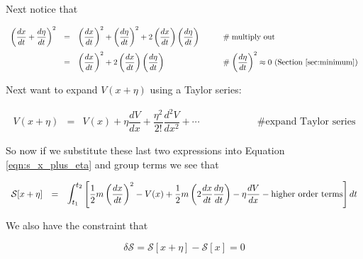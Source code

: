 \documentclass{article}
\theoremstyle{definition}
\begin{document}
\bigskip
\noindent
Next notice that 


\bigskip
\begin{equation*}
\begin{array}{lllll}
 \left ( \dfrac{dx}{dt} + \dfrac{d\eta}{dt} \right )^2 
&=&  \left (\dfrac{dx}{dt} \right)^2 + \left (\dfrac{d\eta }{dt} \right)^2  +2 \left ( \dfrac{dx}{dt} \right ) \left ( \dfrac{d\eta}{dt} \right )          
                                                        &\qquad \mathrel{\#} \text{multiply out} \\
[12pt]
&=&  \left (\dfrac{dx}{dt} \right)^2 + 2 \left ( \dfrac{dx}{dt}
\right ) \left ( \dfrac{d\eta}{dt} \right )
                                                        &\qquad \mathrel {\#} \text{$\left ( \dfrac{d\eta }{dt} \right )^2 \approx 0$ (Section \ref{sec:minimum})}
\end{array}
\end{equation*}

\bigskip
\noindent
Next want to expand $ V(x + \eta)$ using a Taylor series:

\medskip
\begin{equation*}
\begin{array}{lllll}
 V(x + \eta)
&=& V(x) + \eta \dfrac{dV}{dx} + \dfrac{\eta^2}{2!}  \dfrac{d^2V}{dx^2} + \cdots			
														&\quad \qquad \qquad \mathrel{\#} \text{expand Taylor series}
\end{array}
\end{equation*}

\bigskip
\noindent
So now if we substitute these last two expressions into Equation
\ref{eqn:s_x_plus_eta}  and group terms we see that 

\bigskip
\bigskip
\begin{equation*}
\begin{array}{lllll}
\mathcal{S}[x + \eta]
&=& {\displaystyle \mathlarger{ \int_{t_1}^{t_2}} \left [ \frac{1}{2} m \left ( \dfrac{dx}{dt} \right )^2 - V(x) 
+ \dfrac{1}{2} m \left (2 \dfrac{dx}{dt} \dfrac{d \eta}{dt} \right ) - \eta \dfrac{dV}{dx} - \text{higher order terms}  \right ] dt} 
\end{array}
\end{equation*}

\bigskip
\noindent
We also have the constraint that

\bigskip
\begin{equation*}
\delta \mathcal{S} = \mathcal{S}[x+\eta] - \mathcal{S}[x] = 0
\end{equation*}
\end{document}
